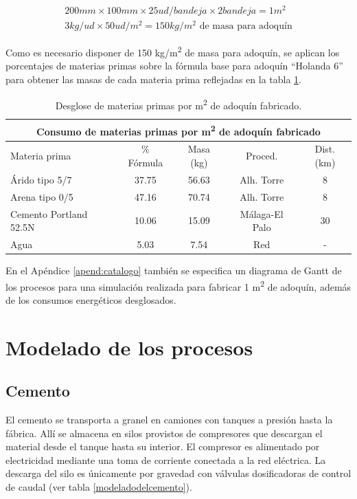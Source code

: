 \begin{gather}
200 mm \times 100 mm \times 25 ud/bandeja \times 2 bandeja = 1 m^2\\
3 kg/ud \times 50 ud/m^2 = 150 kg/m^2 \text{ de masa para adoquín}\label{eq:masa}
\end{gather}

Como es necesario disponer de 150 \si{kg/m^2} de masa para adoquín, se aplican los porcentajes de materias primas sobre la fórmula base para adoquín ``Holanda 6'' para obtener las masas de cada materia prima reflejadas en la tabla \ref{desglosemateriasprimas}.

\begin{table}[!htb]
\centering
\begin{tabular}{lcccc}
\toprule
\multicolumn{5}{c}{Consumo de materias primas por \si{m^2} de adoquín fabricado}\\
\midrule
Materia prima & \% Fórmula & Masa (\si{kg}) & Proced. & Dist. (\si{km})\\
\midrule
Árido tipo 5/7 & 37.75 & 56.63 & Alh. Torre & 8\\
Arena tipo 0/5 & 47.16 & 70.74 & Alh. Torre & 8\\
Cemento Portland 52.5N & 10.06 & 15.09 & Málaga-El Palo & 30\\
Agua & 5.03 & 7.54 & Red & -\\
\bottomrule
\end{tabular}
\caption{Desglose de materias primas por \si{m^2} de adoquín fabricado.}
\label{desglosemateriasprimas}
\end{table}

En el Apéndice \ref{apend:catalogo} también se especifica un diagrama de Gantt de los procesos para una simulación realizada para fabricar 1 \si{m^2} de adoquín, además de los consumos energéticos desglosados.

\section{Modelado de los procesos}\label{sec:modeladoprocesos}
\subsection{Cemento}
El cemento se transporta a granel en camiones con tanques a presión hasta la fábrica. Allí se almacena en silos provistos de compresores que descargan el material desde el tanque hasta su interior. El compresor es alimentado por electricidad mediante una toma de corriente conectada a la red eléctrica. La descarga del silo es únicamente por gravedad con válvulas dosificadoras de control de caudal (ver tabla \ref{modeladodelcemento}).

